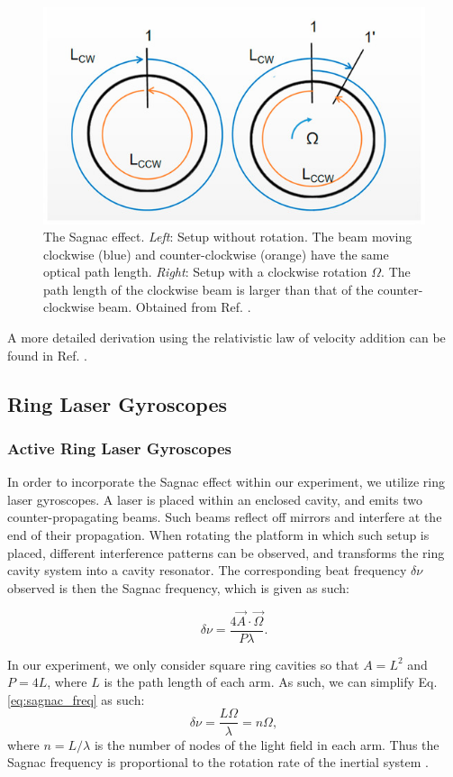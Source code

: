 \documentclass[a4paper]{report}
\numberwithin{equation}{section}
\begin{document}
\begin{figure}[h!]
	\centering
	\includegraphics[width=0.6\columnwidth]{sagnac_effect.jpg}
	\caption{The Sagnac effect. \textit{Left}: Setup without rotation. The beam moving clockwise (blue) and counter-clockwise (orange)
	have the same optical path length. \textit{Right}: Setup with a clockwise rotation $\Omega$. The path length of the 
	clockwise beam is larger than that of the counter-clockwise beam. Obtained from Ref. \cite{Feng2020}.}
	\label{fig:sagnac_effect}
\end{figure}

A more detailed derivation using the relativistic law of velocity addition can be found in Ref. \cite{Benedetto2019}. 

\subsection{Ring Laser Gyroscopes}

\subsubsection{Active Ring Laser Gyroscopes}

In order to incorporate the Sagnac effect within our experiment, we utilize ring laser gyroscopes. A laser is placed within an 
enclosed cavity, and emits two counter-propagating beams. Such beams reflect off mirrors and interfere at the end of their 
propagation. When rotating the platform in which such setup is placed, different interference patterns can be observed, and 
transforms the ring cavity system into a cavity resonator. The corresponding beat frequency $\delta \nu$ observed is then the 
Sagnac frequency, which is given as such:

\begin{equation}
	\delta \nu = \frac{4 \vec{A} \cdot \vec{\Omega}}{P \lambda}.
	\label{eq:sagnac_freq}
\end{equation}

In our experiment, we only consider square ring cavities so that $A = L^2$ and $P = 4L$, where $L$ is the path length of each arm. 
As such, we can simplify Eq. \ref{eq:sagnac_freq} as such: 
\begin{equation}
	\delta \nu  = \frac{L \Omega}{\lambda} = n \Omega,
	\label{eq:sagnac_scale}
\end{equation}
where $n = L / \lambda$ is the number of nodes of the light field in each arm. Thus the Sagnac frequency is proportional to the rotation rate
of the inertial system \cite{Groh2021}.\par 
\end{document}

